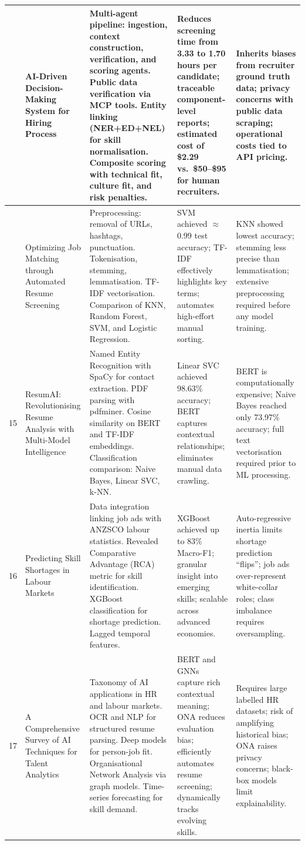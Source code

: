 \documentclass[12pt,a4paper]{report}
\begin{document}
\begin{longtable}{|>{\centering\arraybackslash}p{0.6cm}|p{3.1cm}|p{3.6cm}|p{3.2cm}|p{3.2cm}|}
13 & AI-Driven Decision-Making System for Hiring Process \cite{ref13} &
Multi-agent pipeline: ingestion, context construction, verification, and scoring agents. Public data verification via MCP tools. Entity linking (NER+ED+NEL) for skill normalisation. Composite scoring with technical fit, culture fit, and risk penalties. &
Reduces screening time from 3.33 to 1.70 hours per candidate; traceable component-level reports; estimated cost of \$2.29 vs.\ \$50--\$95 for human recruiters. &
Inherits biases from recruiter ground truth data; privacy concerns with public data scraping; operational costs tied to API pricing. \\
\hline

14 & Optimizing Job Matching through Automated Resume Screening \cite{ref14} &
Preprocessing: removal of URLs, hashtags, punctuation. Tokenisation, stemming, lemmatisation. TF-IDF vectorisation. Comparison of KNN, Random Forest, SVM, and Logistic Regression. &
SVM achieved $\approx$0.99 test accuracy; TF-IDF effectively highlights key terms; automates high-effort manual sorting. &
KNN showed lowest accuracy; stemming less precise than lemmatisation; extensive preprocessing required before any model training. \\
\hline

15 & ResumAI: Revolutionising Resume Analysis with Multi-Model Intelligence \cite{ref15} &
Named Entity Recognition with SpaCy for contact extraction. PDF parsing with pdfminer. Cosine similarity on BERT and TF-IDF embeddings. Classification comparison: Naive Bayes, Linear SVC, k-NN. &
Linear SVC achieved 98.63\% accuracy; BERT captures contextual relationships; eliminates manual data crawling. &
BERT is computationally expensive; Naive Bayes reached only 73.97\% accuracy; full text vectorisation required prior to ML processing. \\
\hline

16 & Predicting Skill Shortages in Labour Markets \cite{ref16} &
Data integration linking job ads with ANZSCO labour statistics. Revealed Comparative Advantage (RCA) metric for skill identification. XGBoost classification for shortage prediction. Lagged temporal features. &
XGBoost achieved up to 83\% Macro-F1; granular insight into emerging skills; scalable across advanced economies. &
Auto-regressive inertia limits shortage prediction ``flips''; job ads over-represent white-collar roles; class imbalance requires oversampling. \\
\hline

17 & A Comprehensive Survey of AI Techniques for Talent Analytics \cite{ref17} &
Taxonomy of AI applications in HR and labour markets. OCR and NLP for structured resume parsing. Deep models for person-job fit. Organisational Network Analysis via graph models. Time-series forecasting for skill demand. &
BERT and GNNs capture rich contextual meaning; ONA reduces evaluation bias; efficiently automates resume screening; dynamically tracks evolving skills. &
Requires large labelled HR datasets; risk of amplifying historical bias; ONA raises privacy concerns; black-box models limit explainability. \\
\hline


\end{longtable}
\end{document}
